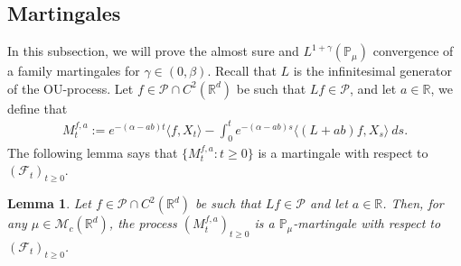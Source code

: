 \documentclass[12pt,a4paper]{amsart}
\theoremstyle{plain}
\newtheorem{lem}[thm]{Lemma}
\theoremstyle{definition}
\numberwithin{equation}{section}
\begin{document}
\subsection{Martingales}
    In this subsection, we will prove the almost sure and $L^{1+\gamma}(\mathbb{P}_{\mu})$ convergence of a family martingales for $\gamma\in (0, \beta)$. Recall that $L$ is the infinitesimal generator of the OU-process. Let $f\in \mathcal{P}\cap C^2(\mathbb R^d)$ be such that $Lf \in \mathcal{P}$, and let $a\in \mathbb R$, we define that
\begin{equation}\begin{split}
\label{defmartingale}
    M_t^{f,a}:=e^{-(\alpha-ab)t}\langle f,X_t\rangle-\int_0^t e^{-(\alpha-ab)s}\langle (L+ab)f, X_s\rangle~ ds.
\end{split}\end{equation}
    The following lemma says that $\{M_t^{f,a}: t\geq 0\}$ is a martingale with respect to $(\mathscr{F}_t)_{t\geq 0}$.
\begin{lem}
\label{lemma25}
    Let $f\in \mathcal{P}\cap C^2(\mathbb R^d)$ be such that $Lf \in \mathcal{P}$ and let $a\in \mathbb R$.
Then, for any $\mu\in \mathcal M_c(\mathbb R^d)$, the process $(M_t^{f,a})_{t\geq 0}$ is a $\mathbb P_\mu$-martingale with respect to $(\mathscr F_t)_{t\geq 0}$.
\end{lem}
\end{document}
